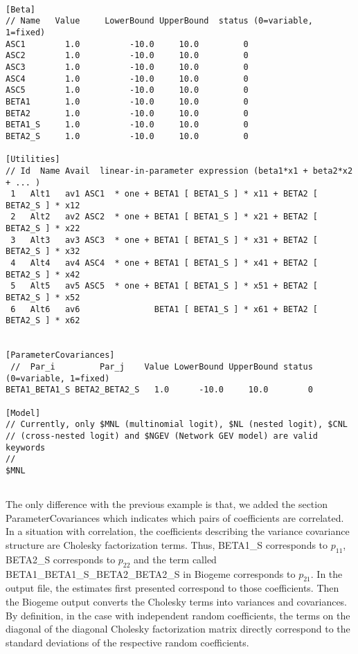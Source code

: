 \documentclass[12pt]{memoir}
\begin{document}
\tiny
{\footnotesize
\begin{verbatim}
 
[Beta]
// Name   Value     LowerBound UpperBound  status (0=variable, 1=fixed)
ASC1        1.0          -10.0     10.0         0
ASC2        1.0          -10.0     10.0         0
ASC3        1.0          -10.0     10.0         0
ASC4        1.0          -10.0     10.0         0
ASC5        1.0          -10.0     10.0         0
BETA1       1.0          -10.0     10.0         0
BETA2       1.0          -10.0     10.0         0
BETA1_S     1.0          -10.0     10.0         0
BETA2_S     1.0          -10.0     10.0         0
 
[Utilities]
// Id  Name Avail  linear-in-parameter expression (beta1*x1 + beta2*x2 + ... )
 1   Alt1   av1 ASC1  * one + BETA1 [ BETA1_S ] * x11 + BETA2 [ BETA2_S ] * x12 
 2   Alt2   av2 ASC2  * one + BETA1 [ BETA1_S ] * x21 + BETA2 [ BETA2_S ] * x22 
 3   Alt3   av3 ASC3  * one + BETA1 [ BETA1_S ] * x31 + BETA2 [ BETA2_S ] * x32 
 4   Alt4   av4 ASC4  * one + BETA1 [ BETA1_S ] * x41 + BETA2 [ BETA2_S ] * x42 
 5   Alt5   av5 ASC5  * one + BETA1 [ BETA1_S ] * x51 + BETA2 [ BETA2_S ] * x52 
 6   Alt6   av6               BETA1 [ BETA1_S ] * x61 + BETA2 [ BETA2_S ] * x62 
  
 
[ParameterCovariances]
 //  Par_i         Par_j    Value LowerBound UpperBound status (0=variable, 1=fixed)
BETA1_BETA1_S BETA2_BETA2_S   1.0      -10.0     10.0        0
    
[Model]
// Currently, only $MNL (multinomial logit), $NL (nested logit), $CNL
// (cross-nested logit) and $NGEV (Network GEV model) are valid keywords
//
$MNL
 
\end{verbatim}
}
\normalsize

The only difference with the previous example is that, we added the section
ParameterCovariances which indicates which pairs of coefficients are
correlated. In a situation with correlation, the coefficients describing the
variance covariance structure are Cholesky factorization terms. Thus, BETA1\_S
corresponds to $p_{11}$, BETA2\_S corresponds to $p_{22}$ and the term called
\newline BETA1\_BETA1\_S\_BETA2\_BETA2\_S in Biogeme corresponds to $p_{21}$.
In the output file, the estimates first presented correspond to those
coefficients. Then the Biogeme output converts the Cholesky terms into
variances and covariances. By definition, in the case with independent random
coefficients, the terms on the diagonal of the diagonal Cholesky factorization
matrix directly correspond to the standard deviations of the respective random coefficients.
\end{document}
